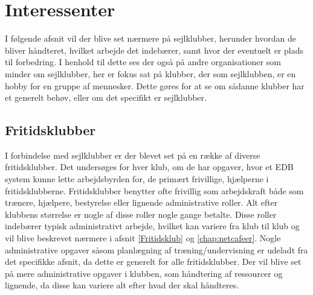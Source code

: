 \chapter{Interessenter}

I følgende afsnit vil der blive set nærmere på sejlklubber, herunder hvordan de bliver håndteret, hvilket arbejde det
indebærer, samt hvor der eventuelt er plads til forbedring. I henhold til dette ses der også på andre organisationer
som minder om sejlklubber, her er fokus sat på klubber, der som sejlklubben, er en hobby for en gruppe af mennesker.
Dette gøres for at se om sådanne klubber har et generelt behøv, eller om det specifikt er sejlklubber.


\section{Fritidsklubber} \label{Fritidsklub}

I forbindelse med sejlklubber er der blevet set på en række af diverse fritidsklubber. Det undersøges for hver klub, om
de har opgaver, hvor et EDB system kunne lette arbejdsbyrden for, de primært frivillige, hjælperne i fritidsklubberne.
Fritidsklubber benytter ofte frivillig som arbejdskraft både som trænere, hjælpere, bestyrelse eller lignende
administrative roller. Alt efter klubbens størrelse er nogle af disse roller nogle gange betalte. Disse roller indebærer
typisk administrativt arbejde, hvilket kan variere fra klub til klub og vil blive beskrevet nærmere i afsnit
\vref{Fritidsklub} og \vref{chap:netcafeer}. Nogle administrative opgaver såsom planlægning af træning/undervisning er
udeladt fra det specifikke afsnit, da dette er generelt for alle fritidsklubber. Der vil  blive set på mere
administrative opgaver i klubben, som håndtering af ressourcer og lignende, da disse kan variere alt efter hvad der skal
håndteres.

%
%


